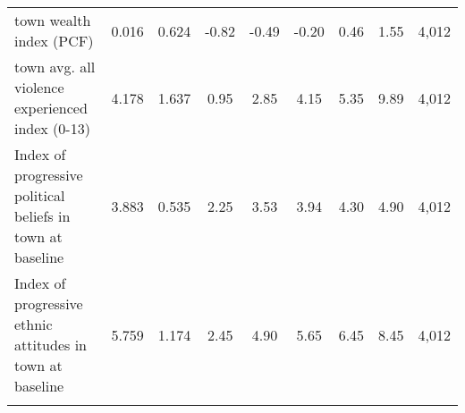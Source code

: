 \begin{tabular}{lcccccccc}
town wealth index (PCF) & 0.016 & 0.624 & -0.82 & -0.49 & -0.20 & 0.46 & 1.55 & 4,012\\
town avg. all violence experienced index (0-13) & 4.178 & 1.637 & 0.95 & 2.85 & 4.15 & 5.35 & 9.89 & 4,012\\
Index of progressive political beliefs in town at baseline & 3.883 & 0.535 & 2.25 & 3.53 & 3.94 & 4.30 & 4.90 & 4,012\\
Index of progressive ethnic attitudes in town at baseline & 5.759 & 1.174 & 2.45 & 4.90 & 5.65 & 6.45 & 8.45 & 4,012\\
\noalign{\smallskip}\hline\end{tabular}
